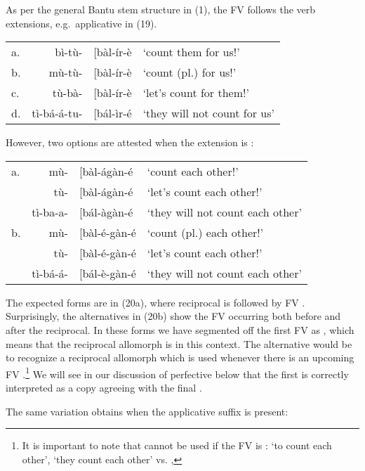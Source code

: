 \documentclass[output=paper,
modfonts
]{LSP/langsci}
\begin{document}
\noindent As per the general Bantu stem structure in (1), the FV follows the verb
extensions, e.g.\ applicative  in (19).

\ea\begin{tabular}[t]{@{}lr@{}ll}
a. & bì-tù- & {[}bàl-ír-è & `count them for us!'\\
b. & mù-tù- & {[}bàl-ír-è & `count (pl.) for us!'\\
c. & tù-bà- & {[}bàl-ír-è & `let's count for them!'\\
d. & tì-bá-á-tu- & {[}bál-ìr-é & `they will not count for us' \\
\end{tabular}
\z

\noindent However, two options are attested when the extension is :

\ea\begin{tabular}[t]{@{}lr@{}ll}
a. & mù- & {[}bàl-ágàn-é & `count each other!'\\
 & tù- & {[}bàl-ágàn-é & `let's count each other!'\\
 & tì-ba-a- & {[}bál-àgàn-é & `they will not count each other'\\
b. & mù- & {[}bàl-é-gàn-é & `count (pl.) each other!'\\
 & tù- & {[}bàl-é-gàn-é & `let's count each other!'\\
 & tì-bá-á- & {[}bál-è-gàn-é & `they will not count each other' \\
 \end{tabular}
 \z

\noindent The expected forms are in (20a), where reciprocal  is
followed by FV . Surprisingly, the alternatives in (20b) show
the FV  occurring both before and after the reciprocal. In
these forms we have segmented off the first FV as , which
means that the reciprocal allomorph is  in this context.
The alternative would be to recognize a reciprocal allomorph
 which is used whenever there is an upcoming FV
.\footnote{It is important to note that  cannot
  be used if the FV is : \form{ò-kú-{[}bál-ágán-á} `to count
  each other', \form{bà-{[}bàl-ágán-á} `they count each other' vs.
  \form{*ò-kú-{[}bál-é-gán-á}, \form{*bà-{[}bàl-é-gán-á.}} We will see
in our discussion of perfective  below that the first
 is correctly interpreted as a copy agreeing with the final
.

The same variation obtains when the applicative suffix is present:
\end{document}
